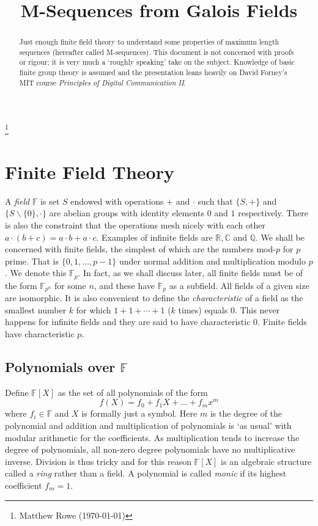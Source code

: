\documentclass[twocolumn]{revtex4-2}
\begin{document}
\title{M-Sequences from Galois Fields}
\thanks{Matthew Rowe (\today)}

\begin{abstract}
Just enough finite field theory to understand some properties of maximum length sequences (hereafter called M-sequences). 
This document is not concerned with proofs or rigour; it is very much a `roughly speaking' take on the subject.
Knowledge of basic finite group theory is assumed and the presentation leans heavily on David Forney's MIT course \emph{Principles of Digital Communication II}.
\end{abstract}

\maketitle

\section{Finite Field Theory}
A \emph{field} $\mathbb{F}$ is set $S$ endowed with operations $+$ and $\cdot$ such that $\{S, + \}$ and $\{S \backslash \{0\}, \cdot \}$  are abelian groups with identity elements $0$ and $1$ respectively.
There is also the constraint that the operations mesh nicely with each other $a \cdot (b + c) = a \cdot b + a \cdot c$. Examples of infinite fields are $\mathbb{R}, \mathbb{C}$ and $\mathbb{Q}$.
We shall be concerned with finite fields, the simplest of which are the numbers mod-$p$ for $p$ prime. That is $\{0,1,\ldots,p-1\}$ under normal addition and multiplication modulo $p$.
We denote this $\mathbb{F}_p$. In fact, as we shall discuss later, all finite fields must be of the form $\mathbb{F}_{p^n}$ for some $n$, and these have $\mathbb{F}_p$ as a subfield.
All fields of a given size are isomorphic. It is also convenient to define the \emph{characteristic} of a field as the smallest number $k$ for which $1+1+\cdots+1$ ($k$ times) equals $0$. 
This never happens for infinite fields and they are said to have characteristic $0$. Finite fields have characteristic $p$.

\subsection{Polynomials over $\mathbb{F}$}
Define $\mathbb{F}[X]$ as the set of all polynomials of the form
\begin{equation}
    f(X) = f_0 + f_1 X + \ldots + f_m x^m
\end{equation}
where $f_i \in \mathbb{F}$ and $X$ is formally just a symbol. Here $m$ is the degree of the polynomial and addition and multiplication of polynomials is `as usual' with modular arithmetic for the coefficients.
As multiplication tends to increase the degree of polynomials, all non-zero degree polynomials have no multiplicative inverse. 
Division is thus tricky and for this reason $\mathbb{F}[X]$ is an algebraic structure called a \emph{ring} rather than a field. A polynomial is called \emph{monic} if its highest coefficient $f_m = 1$.
\end{document}

